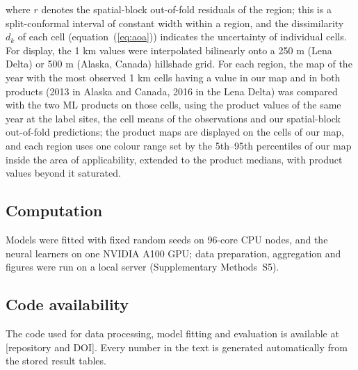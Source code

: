 where $r$ denotes the spatial-block out-of-fold residuals of the region; this is a split-conformal interval\cite{Lei2018} of constant width within a region, and the dissimilarity $d_k$ of each cell (equation~(\ref{eq:aoa})) indicates the uncertainty of individual cells. For display, the 1 km values were interpolated bilinearly onto a 250 m (Lena Delta) or 500 m (Alaska, Canada) hillshade grid. For each region, the map of the year with the most observed 1 km cells having a value in our map and in both products (2013 in Alaska and Canada, 2016 in the Lena Delta) was compared with the two ML products on those cells, using the product values of the same year at the label sites, the cell means of the observations and our spatial-block out-of-fold predictions; the product maps are displayed on the cells of our map, and each region uses one colour range set by the 5th--95th percentiles of our map inside the area of applicability, extended to the product medians, with product values beyond it saturated.

\subsection{Computation}
Models were fitted with fixed random seeds on 96-core CPU nodes, and the neural learners on one NVIDIA A100 GPU; data preparation, aggregation and figures were run on a local server (Supplementary Methods~S5).

\subsection{Code availability}
The code used for data processing, model fitting and evaluation is available at [repository and DOI]. Every number in the text is generated automatically from the stored result tables.
